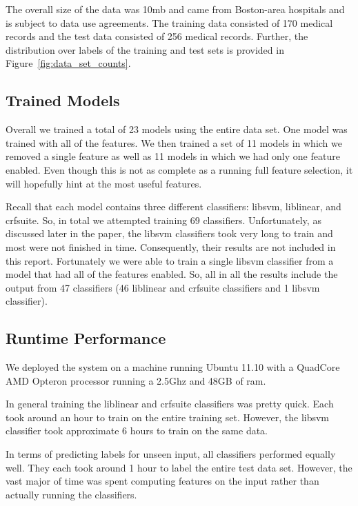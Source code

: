\documentclass[preprint]{style}
\begin{document}
The overall size of the data was 10mb and came from Boston-area hospitals and is subject to data use agreements. The training data consisted of 170 medical records and the test data consisted of 256 medical records. Further, the distribution over labels of the training and test sets is provided in Figure~\ref{fig:data_set_counts}.



\subsection{Trained Models}

Overall we trained a total of 23 models using the entire data set. One model was trained with all of the features. We then trained a set of 11 models in which we removed a single feature as well as 11 models in which we had only one feature enabled. Even  though this is not as complete as a running full feature selection, it will hopefully hint at the most useful features.

Recall that each model contains three different classifiers: libsvm, liblinear, and crfsuite. So, in total we attempted training 69 classifiers. Unfortunately, as discussed later in the paper, the libsvm classifiers took very long to train and most were not finished in time. Consequently, their results are not included in this report. Fortunately we were able to train a single libsvm classifier from a model that had all of the features enabled.  So, all in all the results include the output from 47 classifiers (46 liblinear and crfsuite classifiers and 1 libsvm classifier).

\subsection{Runtime Performance}

We deployed the system on a machine running Ubuntu 11.10 with a QuadCore AMD Opteron processor running a 2.5Ghz and 48GB of ram.

In general training the liblinear and crfsuite classifiers was pretty quick. Each took around an hour to train on the entire training set. However, the libsvm classifier took approximate 6 hours to train on the same data.

In terms of predicting labels for unseen input, all classifiers performed equally well. They each took around 1 hour to label the entire test data set. However, the vast major of time was spent computing features on the input rather than actually running the classifiers.
\end{document}
